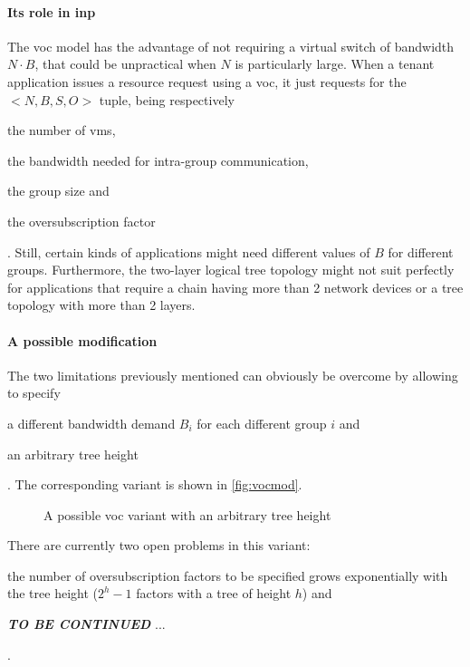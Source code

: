 %
%
\paragraph{Its role in \texorpdfstring{\gls{inp}}{INP}}
The \gls{voc} model has the advantage of not requiring a virtual switch of bandwidth $N \cdot B$, that could be unpractical when $N$ is particularly large.
When a tenant application issues a resource request using a \gls{voc}, it just requests for the $<N, B, S, O>$ tuple, being respectively
\begin{mylist}
    \item the number of \glspl{vm},
    \item the bandwidth needed for intra-group communication,
    \item the group size and
    \item the oversubscription factor
\end{mylist}.
Still, certain kinds of applications might need different values of $B$ for different groups.
Furthermore, the two-layer logical tree topology might not suit perfectly for applications that require a chain having more than 2 network devices or a tree topology with more than 2 layers.

\paragraph{A possible modification}
The two limitations previously mentioned can obviously be overcome by allowing to specify
\begin{mylist}
    \item a different bandwidth demand $B_i$ for each different group $i$ and
    \item an arbitrary tree height
\end{mylist}.
The corresponding variant is shown in \autoref{fig:vocmod}.

\begin{figure}[!htb]
    \centering
    \usebox{\vocmodfigure}
    \caption{A possible \gls{voc} variant with an arbitrary tree height}
    \label{fig:vocmod}
\end{figure}

There are currently two open problems in this variant:
\begin{mylist}
    \item the number of oversubscription factors to be specified grows exponentially with the tree height ($2^h-1$ factors with a tree of height $h$) and
    \item \textbf{\textit{TO BE CONTINUED}} ...
\end{mylist}.